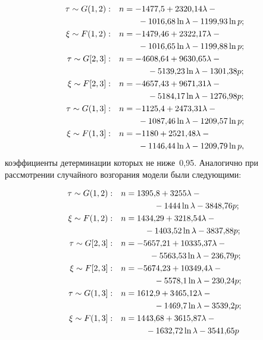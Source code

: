 \begin{multicols}{2}
\noindent
\begin{align*}
\tau\sim {G}(1,2):\quad & n = -1477{,}5+2320{,}14\lambda-{}\\
&\hspace*{8mm}{}-1016{,}68\ln \lambda-1199{,}93\ln p;\\
\xi\sim F(1,2):\quad & n = -1479{,}46+2322{,}17\lambda-{}\\
&\hspace*{8mm}{}-1016{,}65\ln\lambda- 1199{,}88\ln p;\\
\tau\sim {G}[2,3]:\quad & n = -4608{,}64+9630{,}65\lambda-{}\\
&\hspace*{12mm}{}-5139{,}23\ln\lambda-1301{,}38p;\\
\xi\sim F[2,3]:\quad & n = -4657{,}43+9671{,}31\lambda-{}\\
&\hspace*{12mm}{}-5184{,}17\ln\lambda-1276{,}98p;\\
\tau\sim {G}(1,3]:\quad & n = -1125{,}4+2473{,}31\lambda-{}\\
&\hspace*{8mm}{}-1087{,}46\ln\lambda-1209{,}57\ln p;\\
\xi\sim F(1,3]:\quad & n = -1180+2521{,}48\lambda-{}\\
&\hspace*{8mm}{}-1146{,}44\ln\lambda-1209{,}79\ln p,
\end{align*}
коэффициенты детерминации которых не ниже~0,95. Аналогично при рас\-смот\-ре\-нии
случайного возгорания модели были сле\-ду\-ющими:

\noindent
\begin{align*}
\tau\sim {G}(1,2):\quad & n = 1395{,}8+3255\lambda-{}\\
&\hspace*{14mm}{}-1444\ln\lambda -3848{,}76p;\\
\xi\sim F(1,2):\quad & n = 1434{,}29+3218{,}54\lambda-{}\\
&\hspace*{10mm}{}-1403{,}52\ln\lambda-3837{,}88p;\\
\tau\sim {G}[2,3]:\quad & n = -5657{,}21+10335{,}37\lambda-{}\\
&\hspace*{12mm}{}-5563{,}53\ln\lambda-236{,}79p;\\
\xi\sim F[2,3]:\quad & n = -5674{,}23+10349{,}4\lambda-{}\\
&\hspace*{14mm}{}-5578{,}1\ln\lambda-230{,}24p;\\
\tau\sim {G}(1,3]:\quad & n = 1612{,}9+3465{,}12\lambda-{}\\
&\hspace*{14mm}{}-1469{,}7\ln\lambda-3539{,}2p;\\
\xi\sim F(1,3]:\quad & n = 1443{,}68+3615{,}87\lambda-{}\\
&\hspace*{10.5mm}{}-1632{,}72\ln\lambda-3541{,}65p
\end{align*}


\end{multicols}
